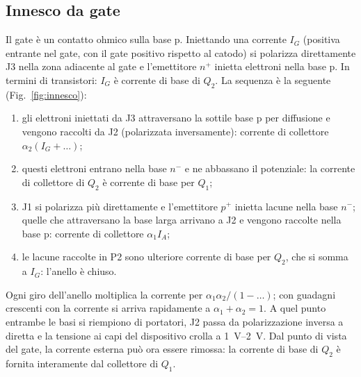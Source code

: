 \documentclass[11pt,a4paper]{article}
\newcommand{\IA}{\ensuremath{I_A}}
\newcommand{\IG}{\ensuremath{I_G}}
\begin{document}
\subsection{Innesco da gate}
Il gate è un contatto ohmico sulla base p. Iniettando una corrente $\IG$ (positiva entrante nel gate, con il gate positivo rispetto al catodo) si polarizza direttamente J3 nella zona adiacente al gate e l'emettitore $n^+$ inietta elettroni nella base p. In termini di transistori: $\IG$ è corrente di base di $Q_2$. La sequenza è la seguente (Fig.~\ref{fig:innesco}):
\begin{enumerate}
  \item gli elettroni iniettati da J3 attraversano la sottile base p per diffusione e vengono raccolti da J2 (polarizzata inversamente): corrente di collettore $\alpha_2 (\IG + \dots)$;
  \item questi elettroni entrano nella base $n^-$ e ne abbassano il potenziale: la corrente di collettore di $Q_2$ è corrente di base per $Q_1$;
  \item J1 si polarizza più direttamente e l'emettitore $p^+$ inietta lacune nella base $n^-$; quelle che attraversano la base larga arrivano a J2 e vengono raccolte nella base p: corrente di collettore $\alpha_1 \IA$;
  \item le lacune raccolte in P2 sono ulteriore corrente di base per $Q_2$, che si somma a $\IG$: l'anello è chiuso.
\end{enumerate}
Ogni giro dell'anello moltiplica la corrente per $\alpha_1\alpha_2/(1-\dots)$; con guadagni crescenti con la corrente si arriva rapidamente a $\alpha_1+\alpha_2=1$. A quel punto entrambe le basi si riempiono di portatori, J2 passa da polarizzazione inversa a diretta e la tensione ai capi del dispositivo crolla a \qtyrange{1}{2}{\V}. Dal punto di vista del gate, la corrente esterna può ora essere rimossa: la corrente di base di $Q_2$ è fornita interamente dal collettore di $Q_1$.
\end{document}
